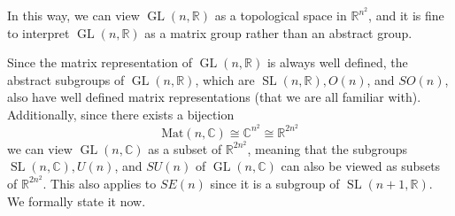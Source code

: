 \documentclass{article}
\DeclareMathOperator{\GL}{GL}
\DeclareMathOperator{\SL}{SL}
\begin{document}
    In this way, we can view $\GL(n, \mathbb{R})$ as a topological space in $\mathbb{R}^{n^2}$, and it is fine to interpret $\GL(n, \mathbb{R})$ as a matrix group rather than an abstract group. 

    Since the matrix representation of $\GL(n, \mathbb{R})$ is always well defined, the abstract subgroups of $\GL(n, \mathbb{R})$, which are $\SL(n, \mathbb{R}), O(n)$, and $SO(n)$, also have well defined matrix representations (that we are all familiar with). Additionally, since there exists a bijection
    \[\text{Mat}(n, \mathbb{C}) \cong \mathbb{C}^{n^2} \cong \mathbb{R}^{2 n^2}\]
    we can view $\GL(n, \mathbb{C})$ as a subset of $\mathbb{R}^{2n^2}$, meaning that the subgroups $\SL(n, \mathbb{C}), U(n)$, and $SU(n)$ of $\GL(n, \mathbb{C})$ can also be viewed as subsets of $\mathbb{R}^{2n^2}$. This also applies to $SE(n)$ since it is a subgroup of $\SL(n+1, \mathbb{R})$. We formally state it now. 
\end{document}
